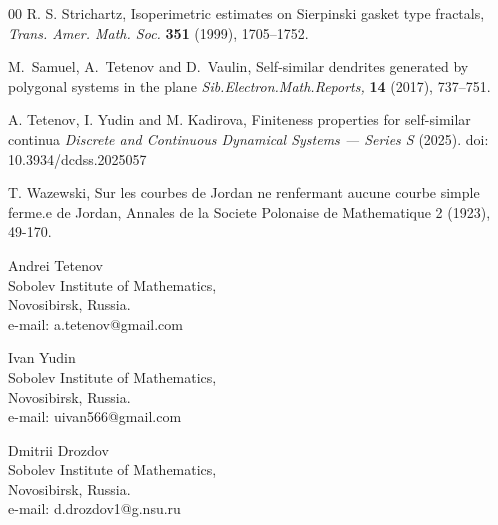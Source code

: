 \documentclass[11pt,reqno]{amsart}
\begin{document}
\begin{thebibliography}{00}
 R. S. Strichartz,
 {Isoperimetric estimates on Sierpinski gasket type fractals},
 \emph{Trans. Amer. Math. Soc.} \textbf{351} (1999), 1705–1752.


 M.~Samuel, A.~Tetenov and D.~Vaulin,
 Self-similar dendrites generated by polygonal systems in the plane 
 \emph{Sib.Electron.Math.Reports,}  \textbf{14}  (2017), 737–751.

 A. Tetenov, I. Yudin and M. Kadirova, 
 {Finiteness properties for self-similar continua} 
 \emph{Discrete and Continuous Dynamical Systems --- Series S} (2025). doi: 10.3934/dcdss.2025057

T. Wazewski, Sur les courbes de Jordan ne renfermant aucune courbe simple ferme.e de Jordan,
Annales de la Societe Polonaise de Mathematique 2 (1923), 49-170.

\end{thebibliography}
\noindent
Andrei Tetenov \\
Sobolev Institute of Mathematics, \\
Novosibirsk, Russia. \\
e-mail: a.tetenov@gmail.com
\bigskip
\noindent

Ivan Yudin \\
Sobolev Institute of Mathematics, \\
Novosibirsk, Russia. \\
e-mail: uivan566@gmail.com
\bigskip
\noindent

Dmitrii Drozdov \\
Sobolev Institute of Mathematics, \\
Novosibirsk, Russia. \\
e-mail: d.drozdov1@g.nsu.ru
\bigskip
\end{document}
